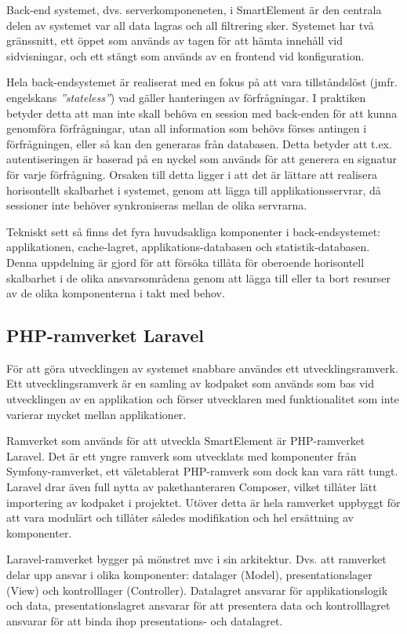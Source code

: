 Back-end systemet, dvs. serverkomponeneten, i SmartElement är den centrala delen av systemet var all data lagras och all filtrering sker. Systemet har två gränssnitt, ett öppet som används av tagen för att hämta innehåll vid sidvisningar, och ett stängt som används av en frontend vid konfiguration.

Hela back-endsystemet är realiserat med en fokus på att vara tillståndslöst (jmfr. engelskans \textit{''stateless''}) vad gäller hanteringen av förfrågningar. I praktiken betyder detta att man inte skall behöva en session med back-enden för att kunna genomföra förfrågningar, utan all information som behövs förses antingen i förfrågningen, eller så kan den generaras från databasen. Detta betyder att t.ex. autentiseringen är baserad på en nyckel som används för att generera en signatur för varje förfrågning. Orsaken till detta ligger i att det är lättare att realisera horisontellt skalbarhet i systemet, genom att lägga till applikationsservrar, då sessioner inte behöver synkroniseras mellan de olika servrarna.

Tekniskt sett så finns det fyra huvudsakliga komponenter i back-endsystemet: applikationen, cache-lagret, applikations-databasen och statistik-databasen. Denna uppdelning är gjord för att försöka tillåta för oberoende horisontell skalbarhet i de olika ansvarsområdena genom att lägga till eller ta bort resurser av de olika komponenterna i takt med behov.

\subsection{PHP-ramverket Laravel}

För att göra utvecklingen av systemet snabbare användes ett utvecklingsramverk. Ett utvecklingsramverk är en samling av kodpaket som används som bas vid utvecklingen av en applikation och förser utvecklaren med funktionalitet som inte varierar mycket mellan applikationer.

Ramverket som används för att utveckla SmartElement är PHP-ramverket Laravel. Det är ett yngre ramverk som utvecklats med komponenter från Symfony-ramverket, ett väletablerat PHP-ramverk som dock kan vara rätt tungt. Laravel drar även full nytta av pakethanteraren Composer, vilket tillåter lätt importering av kodpaket i projektet. Utöver detta är hela ramverket uppbyggt för att vara modulärt och tillåter således modifikation och hel ersättning av komponenter.

Laravel-ramverket bygger på mönstret \gls{mvc} i sin arkitektur. Dvs. att ramverket delar upp ansvar i olika komponenter: datalager (Model), presentationslager (View) och kontrolllager (Controller). Datalagret ansvarar för applikationslogik och data, presentationslagret ansvarar för att presentera data och kontrolllagret ansvarar för att binda ihop presentations- och datalagret.\citep[s. 14-16]{gof}

